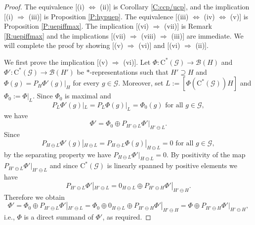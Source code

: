 \documentclass[11pt, draft]{amsart}
\numberwithin{equation}{section}
\theoremstyle{plain}
\theoremstyle{definition}
\theoremstyle{remark}
\newcommand{\B}{{\mathcal{B}}}
\newcommand{\G}{{\mathcal{G}}}
\newcommand{\foral}{\text{ for all }}
\newcommand{\ca}{\mathrm{C}^*}
\begin{document}
\begin{proof}
The equivalence [(i) $\Leftrightarrow$ (ii)] is Corollary \ref{C:ccp/ucp}, and the implication [(i) $\Rightarrow$ (iii)] is Proposition \ref{P:hypuep}. The equivalence [(iii) $\Leftrightarrow$ (iv) $\Leftrightarrow$ (v)] is Proposition \ref{P:uepiffmax}.
The implication [(vi) $\Rightarrow$ (vii)] is Remark \ref{R:uepiffmax} and the implications [(vii) $\Rightarrow$ (viii) $\Rightarrow$ (iii)] are immediate.
We will complete the proof by showing [(v) $\Rightarrow$ (vi)] and [(vi) $\Rightarrow$ (ii)].

We first prove the implication [(v) $\Rightarrow$ (vi)]. Let $\Phi\colon \ca(\G) \to \B(H)$ and $\Phi'\colon \ca(\G)\to\B(H')$ be $*$-representations such that $H'\supseteq H$ and $\Phi(g)=P_H\Phi'(g)|_H$ for every $g\in\G$.
Moreover, set $L:=[\Phi(\ca(\G))H]$ and $\Phi_0:=\Phi|_L$.
Since $\Phi_0$ is maximal and
\[
P_L \Phi'(g)|_L = P_L \Phi(g)|_L = \Phi_0(g) \foral g \in \G,
\]
we have
\[
\Phi' = \Phi_0 \oplus P_{H' \ominus L} \Phi' |_{H' \ominus L}.
\]
Since
\[
P_{H \ominus L} \Phi'(g) |_{H \ominus L}
=
P_{H \ominus L} \Phi(g) |_{H \ominus L}
=
0
\foral g \in \G,
\]
by the separating property we have $P_{H \ominus L} \Phi' |_{H \ominus L} = 0$.
By positivity of the map $P_{H' \ominus L} \Phi' |_{H' \ominus L}$ and since $\ca(\G)$ is linearly spanned by positive elements we have
\[
P_{H' \ominus L} \Phi' |_{H' \ominus L} = 0_{H \ominus L} \oplus P_{H' \ominus H} \Phi' |_{H' \ominus H}.
\]
Therefore we obtain
\[
\Phi'
= \Phi_0 \oplus P_{H' \ominus L} \Phi' |_{H' \ominus L}
= \Phi_0 \oplus 0_{H \ominus L} \oplus P_{H' \ominus H} \Phi' |_{H' \ominus H}
= \Phi \oplus P_{H' \ominus H} \Phi' |_{H' \ominus H},
\]
i.e., $\Phi$ is a direct summand of $\Phi'$, as required.


\end{proof}
\end{document}

